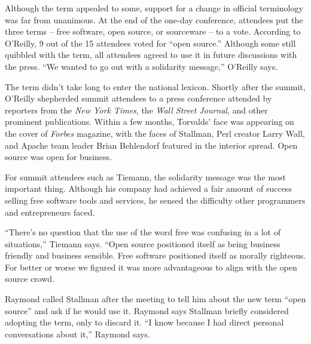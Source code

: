 \fi

\ifdefined\eng
Although the term appealed to some, support for a change in official terminology was far from unanimous. At the end of the one-day conference, attendees put the three terms -- free software, open source, or sourceware -- to a vote. According to O'Reilly, 9 out of the 15 attendees voted for ``open source.'' Although some still quibbled with the term, all attendees agreed to use it in future discussions with the press. ``We wanted to go out with a solidarity message,'' O'Reilly says.
\fi

\ifdefined\chs

\fi

\ifdefined\eng
The term didn't take long to enter the national lexicon. Shortly after the summit, O'Reilly shepherded summit attendees to a press conference attended by reporters from the \textit{New York Times}, the \textit{Wall Street Journal}, and other prominent publications. Within a few months, Torvalds' face was appearing on the cover of \textit{Forbes} magazine, with the faces of Stallman, Perl creator Larry Wall, and Apache team leader Brian Behlendorf featured in the interior spread. Open source was open for business.
\fi

\ifdefined\chs

\fi

\ifdefined\eng
For summit attendees such as Tiemann, the solidarity message was the most important thing. Although his company had achieved a fair amount of success selling free software tools and services, he sensed the difficulty other programmers and entrepreneurs faced.
\fi

\ifdefined\chs

\fi

\ifdefined\eng
``There's no question that the use of the word free was confusing in a lot of situations,'' Tiemann says. ``Open source positioned itself as being business friendly and business sensible. Free software positioned itself as morally righteous. For better or worse we figured it was more advantageous to align with the open source crowd.
\fi

\ifdefined\chs

\fi

\ifdefined\eng
Raymond called Stallman after the meeting to tell him about the new term ``open source'' and ask if he would use it.  Raymond says Stallman briefly considered adopting the term, only to discard it. ``I know because I had direct personal conversations about it,'' Raymond says.
\fi

